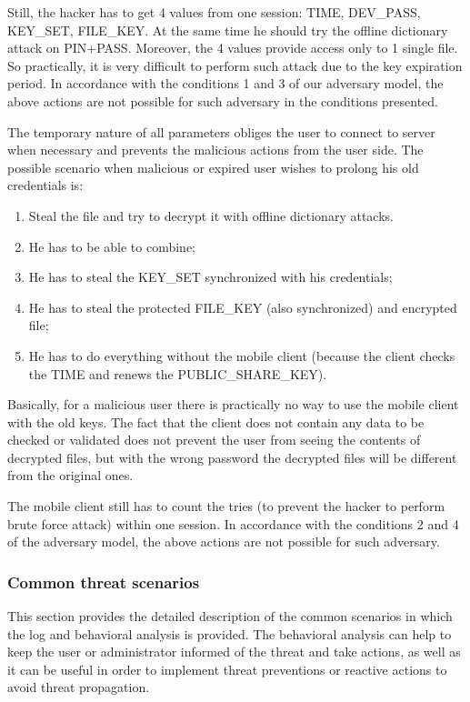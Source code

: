 \documentclass[twocolumn]{svjour3}          	%
\begin{document}
Still, the hacker has to get 4 values from one session: TIME, DEV\_PASS, KEY\_SET, FILE\_KEY. At the same time he should try the offline dictionary attack on PIN+PASS. Moreover, the 4 values provide access only to 1 single file. So practically, it is very difficult to perform such attack due to the key expiration period. In accordance with the conditions 1 and 3 of our adversary model, the above actions are not possible for such adversary in the conditions presented.

The temporary nature of all parameters obliges the user to connect to server when necessary and prevents the malicious actions from the user side. The possible scenario when malicious or expired user wishes to prolong his old credentials is:

\begin{enumerate}[label=(\alph*)]
	\item Steal the file and try to decrypt it with offline dictionary attacks.
	\item He has to be able to combine;
	\item He has to steal the KEY\_SET synchronized with his credentials;
	\item He has to steal the protected FILE\_KEY (also synchronized) and encrypted file;
	\item He has to do everything without the mobile client (because the client checks the TIME and renews the PUBLIC\_SHARE\_KEY).
\end{enumerate}

Basically, for a malicious user there is practically no way to use the mobile client with the old keys. The fact that the client does not contain any data to be checked or validated does not prevent the user from seeing the contents of decrypted files, but with the wrong password the decrypted files will be different from the original ones.

The mobile client still has to count the tries (to prevent the hacker to perform brute force attack) within one session. In accordance with the conditions 2 and 4 of the adversary model, the above actions are not possible for such adversary.

\subsubsection{Common threat scenarios}
\label{sec_common}
This section provides the detailed description of the common scenarios in which the log and behavioral analysis is provided. The behavioral analysis can help to keep the user or administrator informed of the threat and take actions, as well as it can be useful in order to implement threat preventions or reactive actions to avoid threat propagation.
\end{document}

